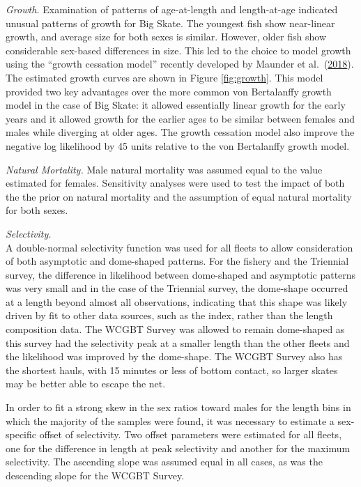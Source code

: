 \documentclass[12pt,]{article}
\begin{document}
\emph{Growth.} Examination of patterns of age-at-length and
length-at-age indicated unusual patterns of growth for Big Skate. The
youngest fish show near-linear growth, and average size for both sexes
is similar. However, older fish show considerable sex-based differences
in size. This led to the choice to model growth using the ``growth
cessation model'' recently developed by Maunder et
al.~(\protect\hyperlink{ref-maunder2018growth}{2018}). The estimated
growth curves are shown in Figure \ref{fig:growth}. This model provided
two key advantages over the more common von Bertalanffy growth model in
the case of Big Skate: it allowed essentially linear growth for the
early years and it allowed growth for the earlier ages to be similar
between females and males while diverging at older ages. The growth
cessation model also improve the negative log likelihood by 45 units
relative to the von Bertalanffy growth model.

\emph{Natural Mortality.} Male natural mortality was assumed equal to
the value estimated for females. Sensitivity analyses were used to test
the impact of both the the prior on natural mortality and the assumption
of equal natural mortality for both sexes.

\emph{Selectivity.}\\
A double-normal selectivity function was used for all fleets to allow
consideration of both asymptotic and dome-shaped patterns. For the
fishery and the Triennial survey, the difference in likelihood between
dome-shaped and asymptotic patterns was very small and in the case of
the Triennial survey, the dome-shape occurred at a length beyond almost
all observations, indicating that this shape was likely driven by fit to
other data sources, such as the index, rather than the length
composition data. The WCGBT Survey was allowed to remain dome-shaped as
this survey had the selectivity peak at a smaller length than the other
fleets and the likelihood was improved by the dome-shape. The WCGBT
Survey also has the shortest hauls, with 15 minutes or less of bottom
contact, so larger skates may be better able to escape the net.

In order to fit a strong skew in the sex ratios toward males for the
length bins in which the majority of the samples were found, it was
necessary to estimate a sex-specific offset of selectivity. Two offset
parameters were estimated for all fleets, one for the difference in
length at peak selectivity and another for the maximum selectivity. The
ascending slope was assumed equal in all cases, as was the descending
slope for the WCGBT Survey.
\end{document}
